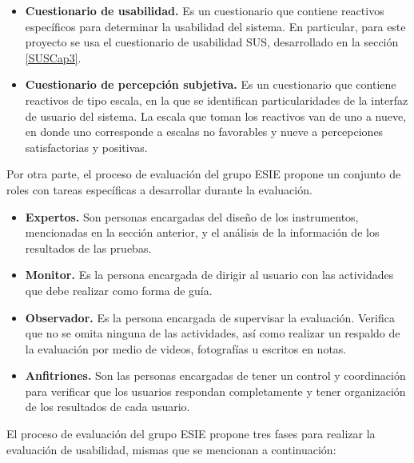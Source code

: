 \begin{itemize}
  \item \textbf{Cuestionario de usabilidad.} Es un cuestionario que contiene reactivos específicos para determinar la usabilidad del sistema. En particular, para este proyecto se usa el cuestionario de usabilidad SUS, desarrollado en la sección \ref{SUSCap3}.
  \item \textbf{Cuestionario de percepción subjetiva.} Es un cuestionario que contiene reactivos de tipo escala, en la que se identifican particularidades de la interfaz de usuario del sistema. La escala que toman los reactivos van de uno a nueve, en donde uno corresponde a escalas no favorables y nueve a percepciones satisfactorias y positivas.
\end{itemize}

Por otra parte, el proceso de evaluación del grupo ESIE propone un conjunto de roles con tareas específicas a desarrollar durante la evaluación.

\begin{itemize}
  \item \textbf{Expertos.} Son personas encargadas del diseño de los instrumentos, mencionadas en la sección anterior, y el análisis de la información de los resultados de las pruebas.
  \item \textbf{Monitor.} Es la persona encargada de dirigir al usuario con las actividades que debe realizar como forma de guía.
  \item \textbf{Observador.} Es la persona encargada de supervisar la evaluación. Verifica que no se omita ninguna de las actividades, así como realizar un respaldo de la evaluación por medio de videos, fotografías u escritos en notas.
  \item \textbf{Anfitriones.} Son las personas encargadas de tener un control y coordinación para verificar que los usuarios respondan completamente y tener organización de los resultados de cada usuario.
\end{itemize}

El proceso de evaluación del grupo ESIE propone tres fases para realizar la evaluación de usabilidad, mismas que se mencionan a continuación:

